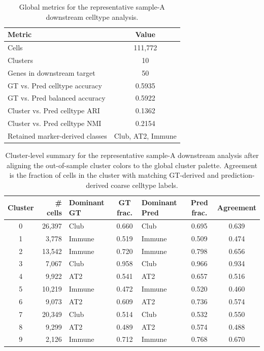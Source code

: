 \documentclass{article}
\begin{document}
\begin{table}[t]
\centering
\scriptsize
\caption{Global metrics for the representative sample-A downstream celltype analysis.}
\label{tab:celltype_global}
\begin{tabular}{lc}
\toprule
\textbf{Metric} & \textbf{Value} \\
\midrule
Cells & 111,772 \\
Clusters & 10 \\
Genes in downstream target & 50 \\
GT vs. Pred celltype accuracy & 0.5935 \\
GT vs. Pred balanced accuracy & 0.5922 \\
Cluster vs. Pred celltype ARI & 0.1362 \\
Cluster vs. Pred celltype NMI & 0.2154 \\
Retained marker-derived classes & Club, AT2, Immune \\
\bottomrule
\end{tabular}
\end{table}

\begin{table}[t]
\centering
\scriptsize
\setlength{\tabcolsep}{5pt}
\caption{Cluster-level summary for the representative sample-A downstream analysis after aligning the out-of-sample cluster colors to the global cluster palette. Agreement is the fraction of cells in the cluster with matching GT-derived and prediction-derived coarse celltype labels.}
\label{tab:celltype_cluster_summary}
\begin{tabular}{c r l c l c c}
\toprule
\textbf{Cluster} & \textbf{\# cells} & \textbf{Dominant GT} & \textbf{GT frac.} & \textbf{Dominant Pred} & \textbf{Pred frac.} & \textbf{Agreement} \\
\midrule
0 & 26,397 & Club & 0.660 & Club & 0.695 & 0.639 \\
1 & 3,778 & Immune & 0.519 & Immune & 0.509 & 0.474 \\
2 & 13,542 & Immune & 0.720 & Immune & 0.798 & 0.656 \\
3 & 7,067 & Club & 0.958 & Club & 0.966 & 0.934 \\
4 & 9,922 & AT2 & 0.541 & AT2 & 0.657 & 0.516 \\
5 & 10,219 & Immune & 0.472 & Immune & 0.520 & 0.460 \\
6 & 9,073 & AT2 & 0.609 & AT2 & 0.736 & 0.574 \\
7 & 20,349 & Club & 0.514 & Club & 0.532 & 0.550 \\
8 & 9,299 & AT2 & 0.489 & AT2 & 0.574 & 0.488 \\
9 & 2,126 & Immune & 0.712 & Immune & 0.768 & 0.670 \\
\bottomrule
\end{tabular}
\end{table}
\end{document}
